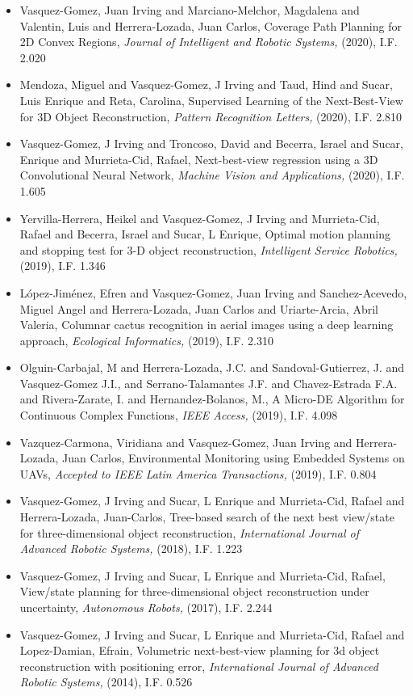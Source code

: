 \begin{itemize} 
\item Vasquez-Gomez, Juan Irving and Marciano-Melchor, Magdalena and Valentin, Luis and Herrera-Lozada, Juan Carlos, Coverage Path Planning for 2D Convex Regions,\textit{ Journal of Intelligent and Robotic Systems,} (2020), I.F. 2.020 
\item Mendoza, Miguel and Vasquez-Gomez, J Irving and Taud, Hind and Sucar, Luis Enrique and Reta, Carolina, Supervised Learning of the Next-Best-View for 3D Object Reconstruction,\textit{ Pattern Recognition Letters,} (2020), I.F. 2.810 
\item Vasquez-Gomez, J Irving and Troncoso, David and Becerra, Israel and Sucar, Enrique and Murrieta-Cid, Rafael, Next-best-view regression using a 3D Convolutional Neural Network,\textit{ Machine Vision and Applications,} (2020), I.F. 1.605 
\item Yervilla-Herrera, Heikel and Vasquez-Gomez, J Irving and Murrieta-Cid, Rafael and Becerra, Israel and Sucar, L Enrique, Optimal motion planning and stopping test for 3-D object reconstruction,\textit{ Intelligent Service Robotics,} (2019), I.F. 1.346 
\item L{\'o}pez-Jim{\'e}nez, Efren and Vasquez-Gomez, Juan Irving and Sanchez-Acevedo, Miguel Angel and Herrera-Lozada, Juan Carlos and Uriarte-Arcia, Abril Valeria, Columnar cactus recognition in aerial images using a deep learning approach,\textit{ Ecological Informatics,} (2019), I.F. 2.310 
\item Olguin-Carbajal, M and Herrera-Lozada, J.C. and Sandoval-Gutierrez, J. and Vasquez-Gomez J.I., and Serrano-Talamantes J.F. and Chavez-Estrada F.A. and Rivera-Zarate, I. and Hernandez-Bolanos, M., A Micro-DE Algorithm for Continuous Complex Functions,\textit{ IEEE Access,} (2019), I.F. 4.098 
\item Vazquez-Carmona, Viridiana and Vasquez-Gomez, Juan Irving and Herrera-Lozada, Juan Carlos, Environmental Monitoring using Embedded Systems on UAVs,\textit{ Accepted to IEEE Latin America Transactions,} (2019), I.F. 0.804 
\item Vasquez-Gomez, J Irving and Sucar, L Enrique and Murrieta-Cid, Rafael and Herrera-Lozada, Juan-Carlos, Tree-based search of the next best view/state for three-dimensional object reconstruction,\textit{ International Journal of Advanced Robotic Systems,} (2018), I.F. 1.223 
\item Vasquez-Gomez, J Irving and Sucar, L Enrique and Murrieta-Cid, Rafael, View/state planning for three-dimensional object reconstruction under uncertainty,\textit{ Autonomous Robots,} (2017), I.F. 2.244 
\item Vasquez-Gomez, J Irving and Sucar, L Enrique and Murrieta-Cid, Rafael and Lopez-Damian, Efrain, Volumetric next-best-view planning for 3d object reconstruction with positioning error,\textit{ International Journal of Advanced Robotic Systems,} (2014), I.F. 0.526 
\end{itemize} 
